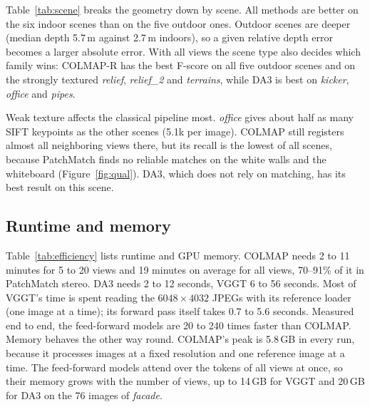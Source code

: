 \documentclass[10pt,twocolumn,letterpaper]{article}
\begin{document}
\begin{table}[t]
\centering
\setlength{\tabcolsep}{3.1pt}

\caption{Per-scene results. SIFT kp.: mean number of SIFT keypoints per image. COLMAP reg.: share of registered
images (\%) for neighbor and random subsets. F@5: F-score at 5\,cm (\%), averaged over neighbor subsets of 5, 10
and 20 views, and with all views.}
\label{tab:scene}
\end{table}

Table~\ref{tab:scene} breaks the geometry down by scene. All methods are better on the six indoor scenes than on
the five outdoor ones. Outdoor scenes are deeper (median depth 5.7\,m against 2.7\,m indoors), so a given
relative depth error becomes a larger absolute error. With all views the scene type also decides which family
wins: COLMAP-R has the best F-score on all five outdoor scenes and on the strongly textured \emph{relief},
\emph{relief\_2} and \emph{terrains}, while DA3 is best on \emph{kicker}, \emph{office} and \emph{pipes}.

Weak texture affects the classical pipeline most. \emph{office} gives about half as many SIFT keypoints as the
other scenes (5.1k per image). COLMAP still registers almost all neighboring views there, but its recall is the
lowest of all scenes, because PatchMatch finds no reliable matches on the white walls and the whiteboard
(Figure~\ref{fig:qual}). DA3, which does not rely on matching, has its best result on this scene.

\subsection{Runtime and memory}

\begin{table}[t]
\centering
\setlength{\tabcolsep}{3.2pt}

\caption{End-to-end runtime per reconstruction (image reading included, model loading excluded; mean) and peak
GPU memory (maximum) on one A100. Columns: number of input views. 5--20 views: three scenes, neighbor subsets;
all: 11 scenes, 34 views on average. DA3-BA and VGGT-BA include the feed-forward model.}
\label{tab:efficiency}
\end{table}

Table~\ref{tab:efficiency} lists runtime and GPU memory. COLMAP needs 2 to 11 minutes for 5 to 20 views and
19 minutes on average for all views, 70--91\% of it in PatchMatch stereo. DA3 needs 2 to 12 seconds, VGGT 6 to
56 seconds. Most of VGGT's time is spent reading the $6048\times4032$ JPEGs with its reference loader (one image at a
time); its forward pass itself takes 0.7 to 5.6 seconds. Measured end to end, the feed-forward models are 20 to
240 times faster than COLMAP. Memory behaves the other way round. COLMAP's peak is 5.8\,GB in every run, because it
processes images at a fixed resolution and one reference image at a time. The feed-forward models attend over the
tokens of all views at once, so their memory grows with the number of views, up to 14\,GB for VGGT and 20\,GB for
DA3 on the 76 images of \emph{facade}.
\end{document}
